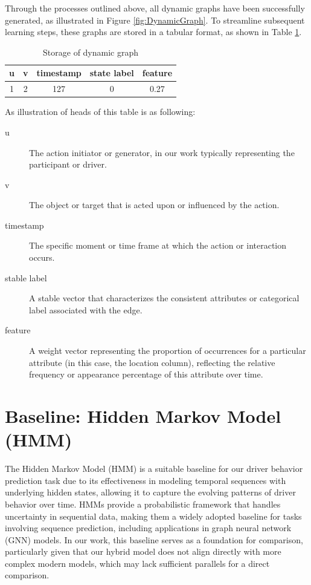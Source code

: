 Through the processes outlined above, all dynamic graphs have been successfully generated, as illustrated in Figure \ref{fig:DynamicGraph}. To streamline subsequent learning steps, these graphs are stored in a tabular format, as shown in Table \ref{tab:dynamic_graph_storage}.



\begin{table}[h]
    \centering
    \begin{tabular}{ccccc}
        \toprule
        \textbf{u} & \textbf{v} & \textbf{timestamp} & \textbf{state label} & \textbf{feature} \\
        \midrule
        1 & 2 & 127 & 0 & 0.27 \\
        \bottomrule
    \end{tabular}
    \caption{Storage of dynamic graph}
    \label{tab:dynamic_graph_storage}
\end{table}

As illustration of heads of this table is as following:

\begin{description}
    \item[u] The action initiator or generator, in our work typically representing the participant or driver.
    \item[v] The object or target that is acted upon or influenced by the action.
    \item[timestamp] The specific moment or time frame at which the action or interaction occurs.
    \item[stable label] A stable vector that characterizes the consistent attributes or categorical label associated with the edge.
    \item[feature] A weight vector representing the proportion of occurrences for a particular attribute (in this case, the location column), reflecting the relative frequency or appearance percentage of this attribute over time.
\end{description}



\section{Baseline: Hidden Markov Model (HMM)}


The Hidden Markov Model (HMM) is a suitable baseline for our driver behavior prediction task due to its effectiveness in modeling temporal sequences with underlying hidden states, allowing it to capture the evolving patterns of driver behavior over time. HMMs provide a probabilistic framework that handles uncertainty in sequential data, making them a widely adopted baseline for tasks involving sequence prediction, including applications in graph neural network (GNN) models. In our work, this baseline serves as a foundation for comparison, particularly given that our hybrid model does not align directly with more complex modern models, which may lack sufficient parallels for a direct comparison.

